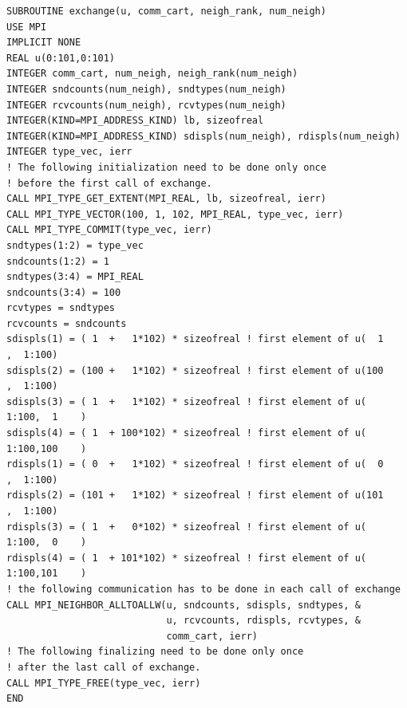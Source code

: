 \begin{example}
\begin{small}
\begin{lstlisting}[language={[MPI]Fortran},basicstyle=\lstsmall,caption={Communication routine with sparse neighborhood alltoallw and without local data copying},label=poisson-end]
SUBROUTINE exchange(u, comm_cart, neigh_rank, num_neigh)
USE MPI
IMPLICIT NONE
REAL u(0:101,0:101)
INTEGER comm_cart, num_neigh, neigh_rank(num_neigh)
INTEGER sndcounts(num_neigh), sndtypes(num_neigh)
INTEGER rcvcounts(num_neigh), rcvtypes(num_neigh)
INTEGER(KIND=MPI_ADDRESS_KIND) lb, sizeofreal
INTEGER(KIND=MPI_ADDRESS_KIND) sdispls(num_neigh), rdispls(num_neigh)
INTEGER type_vec, ierr
! The following initialization need to be done only once
! before the first call of exchange.
CALL MPI_TYPE_GET_EXTENT(MPI_REAL, lb, sizeofreal, ierr)
CALL MPI_TYPE_VECTOR(100, 1, 102, MPI_REAL, type_vec, ierr)
CALL MPI_TYPE_COMMIT(type_vec, ierr)
sndtypes(1:2) = type_vec
sndcounts(1:2) = 1
sndtypes(3:4) = MPI_REAL
sndcounts(3:4) = 100
rcvtypes = sndtypes
rcvcounts = sndcounts
sdispls(1) = ( 1  +   1*102) * sizeofreal ! first element of u(  1    ,  1:100)
sdispls(2) = (100 +   1*102) * sizeofreal ! first element of u(100    ,  1:100)
sdispls(3) = ( 1  +   1*102) * sizeofreal ! first element of u(  1:100,  1    )
sdispls(4) = ( 1  + 100*102) * sizeofreal ! first element of u(  1:100,100    )
rdispls(1) = ( 0  +   1*102) * sizeofreal ! first element of u(  0    ,  1:100)
rdispls(2) = (101 +   1*102) * sizeofreal ! first element of u(101    ,  1:100)
rdispls(3) = ( 1  +   0*102) * sizeofreal ! first element of u(  1:100,  0    )
rdispls(4) = ( 1  + 101*102) * sizeofreal ! first element of u(  1:100,101    )
! the following communication has to be done in each call of exchange
CALL MPI_NEIGHBOR_ALLTOALLW(u, sndcounts, sdispls, sndtypes, &
                            u, rcvcounts, rdispls, rcvtypes, &
                            comm_cart, ierr)
! The following finalizing need to be done only once
! after the last call of exchange.
CALL MPI_TYPE_FREE(type_vec, ierr)
END
\end{lstlisting}
\end{small}



\end{example}
